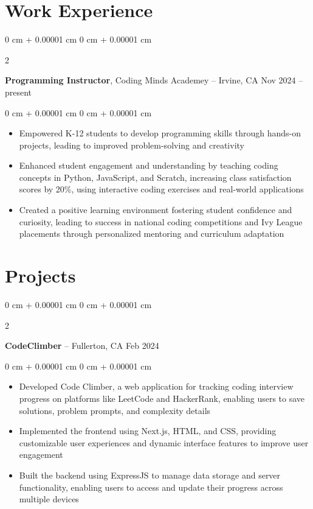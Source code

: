 \documentclass[10pt, letterpaper]{article}
\newenvironment{highlights}{
    \begin{itemize}[
        topsep=0.10 cm,
        parsep=0.10 cm,
        partopsep=0pt,
        itemsep=0pt,
        leftmargin=0 cm + 10pt
    ]
}{
    \end{itemize}
} %
\newenvironment{onecolentry}{
    \begin{adjustwidth}{
        0 cm + 0.00001 cm
    }{
        0 cm + 0.00001 cm
    }
}{
    \end{adjustwidth}
} %
\newenvironment{twocolentry}[2][]{
    \onecolentry
    \def\secondColumn{#2}
    \setcolumnwidth{\fill, 4.5 cm}
    \begin{paracol}{2}
}{
    \switchcolumn \raggedleft \secondColumn
    \end{paracol}
    \endonecolentry
} %
\begin{document}
    
    \section{Work Experience}



        
        \begin{twocolentry}{
            Nov 2024 – present
        }
            \textbf{Programming Instructor}, Coding Minds Academey -- Irvine, CA\end{twocolentry}

        \vspace{0.10 cm}
        \begin{onecolentry}
            \begin{highlights}
                \item Empowered K-12 students to develop programming skills through hands-on projects, leading to improved problem-solving and creativity
                \item Enhanced student engagement and understanding by teaching coding concepts in Python, JavaScript, and Scratch, increasing class satisfaction scores by 20\%, using interactive coding exercises and real-world applications
                \item Created a positive learning environment fostering student confidence and curiosity, leading to success in national coding competitions and Ivy League placements through personalized mentoring and curriculum adaptation
            \end{highlights}
        \end{onecolentry}



    
    \section{Projects}



        
        \begin{twocolentry}{
            Feb 2024
        }
            \textbf{CodeClimber} -- Fullerton, CA\end{twocolentry}

        \vspace{0.10 cm}
        \begin{onecolentry}
            \begin{highlights}
                \item Developed Code Climber, a web application for tracking coding interview progress on platforms like LeetCode and HackerRank, enabling users to save solutions, problem prompts, and complexity details
                \item Implemented the frontend using Next.js, HTML, and CSS, providing customizable user experiences and dynamic interface features to improve user engagement
                \item Built the backend using ExpressJS to manage data storage and server functionality, enabling users to access and update their progress across multiple devices
            \end{highlights}
        \end{onecolentry}
\end{document}
